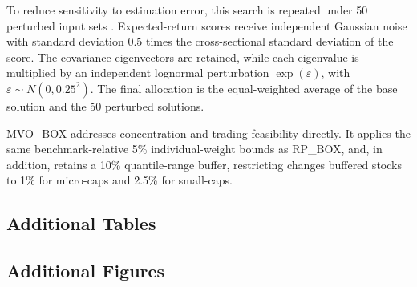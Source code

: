 \documentclass[preprint,12pt,authoryear]{elsarticle}
\begin{document}
\begin{appendices}
To reduce sensitivity to estimation error, this search is repeated under 50 perturbed input sets \citep{michaud1989}. Expected-return scores receive independent Gaussian noise with standard deviation $0.5$ times the cross-sectional standard deviation of the score. The covariance eigenvectors are retained, while each eigenvalue is multiplied by an independent lognormal perturbation $\exp(\varepsilon)$, with $\varepsilon\sim N(0,0.25^2)$. The final allocation is the equal-weighted average of the base solution and the 50 perturbed solutions.

MVO\_BOX addresses concentration and trading feasibility directly. It applies the same benchmark-relative 5\% individual-weight bounds as RP\_BOX, and, in addition, retains a 10\% quantile-range buffer, restricting changes buffered stocks to 1\% for micro-caps and 2.5\% for small-caps.

\clearpage

\subsection{Additional Tables}















\clearpage

\subsection{Additional Figures}














\end{appendices}
\end{document}
